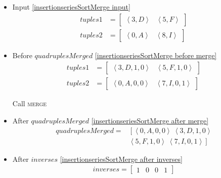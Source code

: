 \begin{frame}[containsverbatim]{\insertionseriesexampleframe}
\begin{columns}[c]
                \begin{column}{0.7\textwidth}
                    \vspace{-0.3cm}
                    \tiny
                    \begin{multicols}{2}
                        \begin{itemize}
                            \item Input \cref{insertionseriesSortMerge input}
                            \begin{align*}
                                tuples1 & = \begin{bmatrix}\left<3, D\right> & \left<5, F\right>\end{bmatrix} \\
                                tuples2 & = \begin{bmatrix}\left<0, A\right> & \left<8, I\right>\end{bmatrix}
                            \end{align*}

                            \item Before $quadruplesMerged$ \cref{insertionseriesSortMerge before merge}
                            \begin{align*}
                                tuples1 & = \begin{bmatrix}\left<3, D, 1, 0\right> & \left<5, F, 1, 0\right>\end{bmatrix} \\
                                tuples2 & = \begin{bmatrix}\left<0, A, 0, 0\right> & \left<7, I, 0, 1\right>\end{bmatrix}
                            \end{align*}

                            Call \textsc{merge}

                            \item After $quadruplesMerged$ \cref{insertionseriesSortMerge after merge}
                            \begin{align*}
                                quadruplesMerged = & \left[\left<0, A, 0, 0\right> \ \left<3, D, 1, 0\right>\right. \\ 
                                & \left.\left<5, F, 1, 0\right> \ \left<7, I, 0, 1\right>\right]
                            \end{align*}

                            \item After $inverses$ \cref{insertionseriesSortMerge after inverses}
                            \begin{align*}
                                inverses = \begin{bmatrix}1 & 0 & 0 & 1\end{bmatrix}
                            \end{align*}


\end{itemize}
\end{multicols}
\end{column}
\end{columns}
\end{frame}
